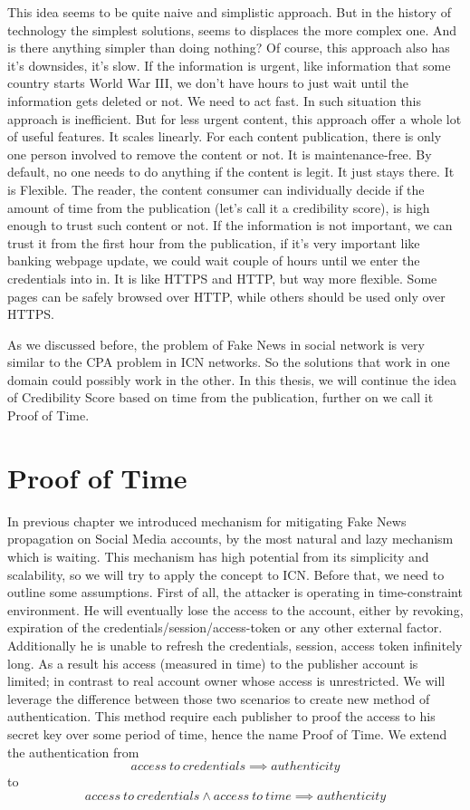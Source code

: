 \documentclass[nostrict]{szablonPG}
\begin{document}
This idea seems to be quite naive and simplistic approach. But  in the history of technology the simplest solutions, seems to displaces the more complex one. And is there anything simpler than doing nothing? 
Of course, this approach also has it's downsides, it's slow. If the information is urgent, like information that some country starts World War III, we don't have hours to just wait until the information gets deleted or not. We need to act fast. In such situation this approach is inefficient. But for less urgent content, this approach offer a whole lot of useful features. It scales linearly. For each content publication, there is only one person involved to remove the content or not. It is maintenance-free. By default, no one needs to do anything if the content is legit. It just stays there. It is Flexible. The reader, the content consumer can individually decide if the amount of time from the publication (let's call it a credibility score), is high enough to trust such content or not. If the information is not important, we can trust it from the first hour from the publication, if it's very important like banking webpage update, we could wait couple of hours until we enter the credentials into in. It is like HTTPS and HTTP, but way more flexible. Some pages can be safely browsed over HTTP, while others should be used only over HTTPS. 

As we discussed before, the problem of Fake News in social network is very similar to the CPA problem in ICN networks. So the solutions that work in one domain could possibly work in the other. In this thesis, we will continue the idea of Credibility Score based on time from the publication, further on we call it Proof of Time.

\section{Proof of Time}
\label{proof-of-time}
In previous chapter we introduced mechanism for mitigating Fake News propagation on Social Media accounts, by the most natural and lazy mechanism which is waiting. This mechanism has high potential from its simplicity and scalability, so we will try to apply the concept to ICN. Before that, we need to outline some assumptions. First of all, the attacker is operating in time-constraint environment. He will eventually lose the access to the account, either by revoking, expiration of the  credentials/session/access-token or any other external factor. Additionally he is unable to refresh the credentials, session, access token infinitely long. As a result his access (measured in time) to the publisher account is limited; in contrast to real account owner whose access is unrestricted.
We will leverage the difference between those two scenarios to create new method of authentication. This method require each publisher to proof the access to his secret key over some period of time, hence the name Proof of Time. 
We extend the authentication from 
\[access\ to\ credentials \implies authenticity\]
to 
\[access\ to\ credentials \land access\ to\ time \implies authenticity\]
\end{document}

